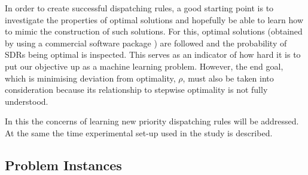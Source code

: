 \documentclass[twocolumn]{svjour3}
\newcommand{\namerho}{deviation from optimality, $\rho$}
\newcommand{\dr}{dispatching rule}
\begin{document}
In order to create successful \dr s, a good starting point is to 
investigate the properties of optimal solutions and hopefully be able to learn 
how to mimic the construction of such solutions. For this, optimal 
solutions (obtained by using a commercial software package \cite{gurobi}) are 
followed and the probability of SDRs being optimal is inspected. 
This serves as an indicator of how hard it is to put our objective up as a 
machine learning problem. 
However, the end goal, which is minimising \namerho, must also be taken into 
consideration because its relationship to stepwise optimality is not fully 
understood.

In this  the concerns of learning new priority \dr s 
will be addressed. At the same the time experimental set-up used in the study 
is described. 

\subsection{Problem Instances}\label{sec:data:sim}
\end{document}
